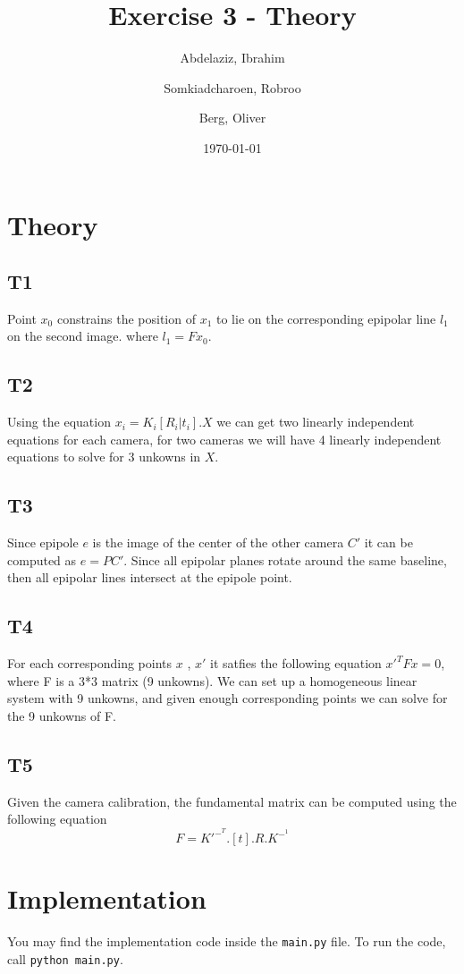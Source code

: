 \documentclass[a4paper, twoside, english]{article}
\title{Exercise 3 - Theory}
\author{
	Abdelaziz, Ibrahim
	\and
	Somkiadcharoen, Robroo
	\and
	Berg, Oliver
}
\date{\today}
\begin{document}
\maketitle


\section{Theory}

\subsection{T1}
Point $x_0$ constrains the position of $x_1$ to lie on the corresponding epipolar line $l_1$ on the second image. where $l_1 = Fx_0$.

\subsection{T2}
Using the equation $x_i = K_i[R_i|t_i].X$ we can get two linearly independent equations for each camera, for two cameras we will have 4 linearly independent equations to solve for 3 unkowns in $X$.

\subsection{T3}
Since epipole $e$ is the image of the center of the other camera $C'$ it can be computed as $e = PC'$. 
Since all epipolar planes rotate around the same baseline, then all epipolar lines intersect at the epipole point.

\subsection{T4}
For each corresponding points $x$ , $x'$ it satfies the following equation $x'^TFx=0$, where F is a 3*3 matrix (9 unkowns). We can set up a homogeneous linear system with 9 unkowns, and given enough corresponding points we can solve for the 9 unkowns of F.
\subsection{T5}
Given the camera calibration, the fundamental matrix can be computed using the following equation \begin{equation} F = K'^-^T.[t].R.K^-^1 \end{equation}
\section{Implementation}

You may find the implementation code inside the \lstinline{main.py} file. To run the code, call \lstinline{python main.py}.
\end{document}
